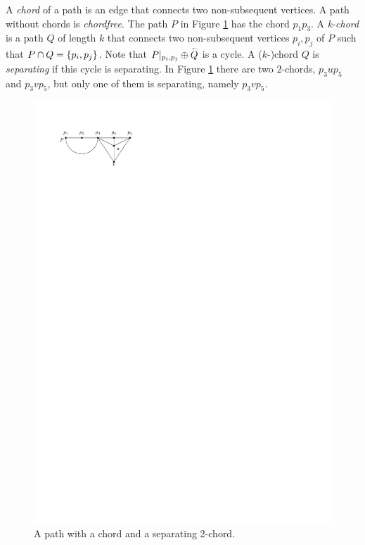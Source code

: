     A \emph{chord} of a path is an edge that connects two non-subsequent vertices. A path without chords is \emph{chordfree}. The path $P$ in Figure \ref{fig:right:chord} has the chord $p_1 p_3$.
    A \emph{k-chord} is a path $Q$ of length $k$ that connects two non-subsequent vertices $p_i, p_j$ of $P$ such that $P \cap Q = \left\lbrace {p_i, p_j} \right\rbrace$.
    Note that $P|_{p_i, p_j} \oplus \accentset{\leftharpoonup}{Q}$ is a cycle.
    A ($k$-)chord $Q$ is \emph{separating} if this cycle is separating.
    In Figure \ref{fig:right:chord} there are two $2$-chords, $p_3 u p_5$ and $p_3 v p_5$, but only one of them is separating, namely $p_3 v p_5$.

    \begin{figure}[h]
      \centering
      \includegraphics[scale=1]{unifiedAlgo/img/rightNeighbourwalk/chords.pdf}
      \caption{A path with a chord and a separating 2-chord.}
      \label{fig:right:chord}
    \end{figure}

